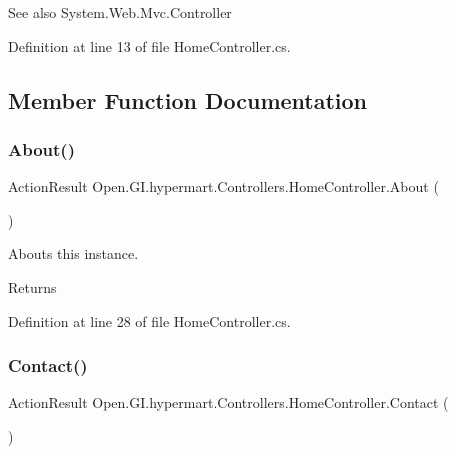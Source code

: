 \begin{DoxySeeAlso}{See also}
System.\+Web.\+Mvc.\+Controller


\end{DoxySeeAlso}


Definition at line 13 of file Home\+Controller.\+cs.



\subsection{Member Function Documentation}
\mbox{\label{class_open_1_1_g_i_1_1hypermart_1_1_controllers_1_1_home_controller_a6d90d2a8ae2ce9f7c9ec38b175847e6f}} 
\subsubsection{About()}
{\footnotesize\ttfamily Action\+Result Open.\+G\+I.\+hypermart.\+Controllers.\+Home\+Controller.\+About (\begin{DoxyParamCaption}{ }\end{DoxyParamCaption})}



Abouts this instance. 

\begin{DoxyReturn}{Returns}

\end{DoxyReturn}


Definition at line 28 of file Home\+Controller.\+cs.

\mbox{\label{class_open_1_1_g_i_1_1hypermart_1_1_controllers_1_1_home_controller_a758666761af826c9091b8a8655eb5e18}} 
\subsubsection{Contact()}
{\footnotesize\ttfamily Action\+Result Open.\+G\+I.\+hypermart.\+Controllers.\+Home\+Controller.\+Contact (\begin{DoxyParamCaption}{ }\end{DoxyParamCaption})}




